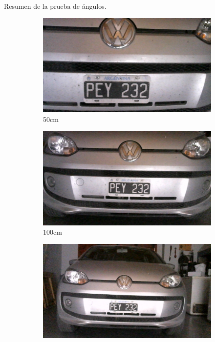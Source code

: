 \begin{table}
    \centering
    
    \caption{Resumen de la prueba de ángulos.}
    \label{tab:resumen-angulo}
\end{table}

\begin{figure}
    \centering
    \begin{subfigure}{.3\textwidth}
        \centering
        \includegraphics[width=\textwidth]{imgs/test-distancia/0_50.jpg}
        \caption{50cm}
    \end{subfigure}
    \begin{subfigure}{.3\textwidth}
        \centering
        \includegraphics[width=\textwidth]{imgs/test-distancia/0_100.jpg}
        \caption{100cm}
    \end{subfigure}
    \begin{subfigure}{.3\textwidth}
        \centering
        \includegraphics[width=\textwidth]{imgs/test-distancia/0_150.jpg}

\end{subfigure}
\end{figure}
